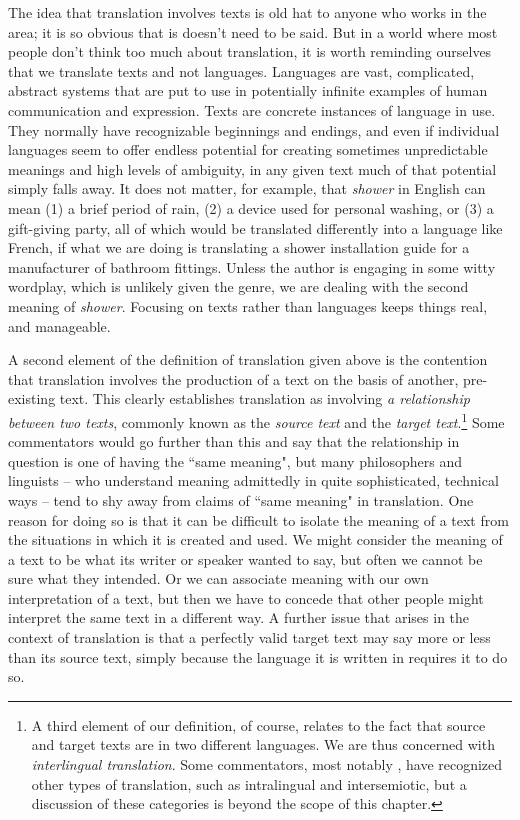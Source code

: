 \documentclass[output=paper]{langscibook}
\begin{document}
The idea that translation involves texts is old hat to anyone who works in the area; it is so obvious that is doesn't need to be said. But in a world where most people don't think too much about translation, it is worth reminding ourselves that we translate texts and not languages. Languages are vast, complicated, abstract systems that are put to use in potentially infinite examples of human communication and expression. Texts are concrete instances of language in use. They normally have recognizable beginnings and endings, and even if individual languages seem to offer endless potential for creating sometimes unpredictable meanings and high levels of ambiguity, in any given text much of that potential simply falls away. It does not matter, for example, that \emph{shower} in English can mean (1) a brief period of rain, (2) a device used for personal washing, or (3) a gift-giving party, all of which would be translated differently into a language like French, if what we are doing is translating a shower installation guide for a manufacturer of bathroom fittings. Unless the author is engaging in some witty wordplay, which is unlikely given the genre, we are dealing with the second meaning of \emph{shower}. Focusing on texts rather than languages keeps things real, and manageable.

A second element of the definition of translation given above is the contention that translation involves the production of a text on the basis of another, pre-existing text. This clearly establishes translation as involving \textit{a relationship between two texts}, commonly known as the \emph{source text} and the \emph{target text}.\footnote{A third element of our definition, of course, relates to the fact that source and target texts are in two different languages. We are thus concerned with \textit{interlingual translation}. Some commentators, most notably \citet{Jakobson1959}, have recognized other types of translation, such as intralingual and intersemiotic, but a discussion of these categories is beyond the scope of this chapter.} Some commentators would go further than this and say that the relationship in question is one of having the “same meaning", but many philosophers and linguists -- who understand meaning admittedly in quite sophisticated, technical ways -- tend to shy away from claims of “same meaning" in translation. One reason for doing so is that it can be difficult to isolate the meaning of a text from the situations in which it is created and used. We might consider the meaning of a text to be what its writer or speaker wanted to say, but often we cannot be sure what they intended. Or we can associate meaning with our own interpretation of a text, but then we have to concede that other people might interpret the same text in a different way. A further issue that arises in the context of translation is that a perfectly valid target text may say more or less than its source text, simply because the language it is written in requires it to do so.
\end{document}
